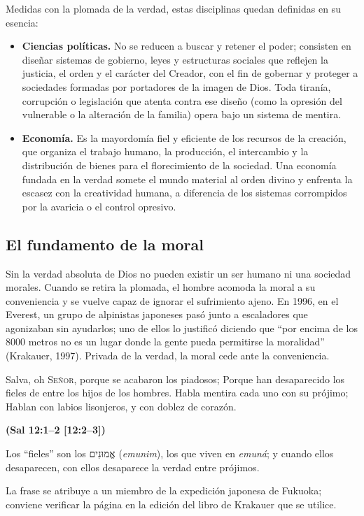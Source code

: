 \documentclass[11pt,letterpaper]{article}
\newcommand{\heb}[1]{\mbox{\foreignlanguage{hebrew}{#1}}}
\newcommand{\SENOR}{\textsc{Señor}}
\newcommand{\fuente}[1]{\par\hfill{\upshape\bfseries\small\textcolor{azul}{#1}}}
\begin{document}
Medidas con la plomada de la verdad, estas disciplinas quedan definidas en su esencia:
\begin{itemize}
\item \textbf{Ciencias políticas.} No se reducen a buscar y retener el poder; consisten en diseñar sistemas de gobierno, leyes y estructuras sociales que reflejen la justicia, el orden y el carácter del Creador, con el fin de gobernar y proteger a sociedades formadas por portadores de la imagen de Dios. Toda tiranía, corrupción o legislación que atenta contra ese diseño (como la opresión del vulnerable o la alteración de la familia) opera bajo un sistema de mentira.
\item \textbf{Economía.} Es la mayordomía fiel y eficiente de los recursos de la creación, que organiza el trabajo humano, la producción, el intercambio y la distribución de bienes para el florecimiento de la sociedad. Una economía fundada en la verdad somete el mundo material al orden divino y enfrenta la escasez con la creatividad humana, a diferencia de los sistemas corrompidos por la avaricia o el control opresivo.
\end{itemize}

\subsection{El fundamento de la moral}
Sin la verdad absoluta de Dios no pueden existir un ser humano ni una sociedad morales. Cuando se retira la plomada, el hombre acomoda la moral a su conveniencia y se vuelve capaz de ignorar el sufrimiento ajeno. En 1996, en el Everest, un grupo de alpinistas japoneses pasó junto a escaladores que agonizaban sin ayudarlos; uno de ellos lo justificó diciendo que ``por encima de los 8000 metros no es un lugar donde la gente pueda permitirse la moralidad'' (Krakauer, 1997). Privada de la verdad, la moral cede ante la conveniencia.

\begin{cita}Salva, oh \SENOR{}, porque se acabaron los piadosos; Porque han desaparecido los fieles de entre los hijos de los hombres. Habla mentira cada uno con su prójimo; Hablan con labios lisonjeros, y con doblez de corazón.\fuente{(Sal 12:1--2 [12:2--3])}\end{cita}

Los ``fieles'' son los \heb{אֱמוּנִים} (\emph{emunim}), los que viven en \emph{emuná}; y cuando ellos desaparecen, con ellos desaparece la verdad entre prójimos.

\begin{nota}[Precisión]
La frase se atribuye a un miembro de la expedición japonesa de Fukuoka; conviene verificar la página en la edición del libro de Krakauer que se utilice.
\end{nota}
\end{document}
